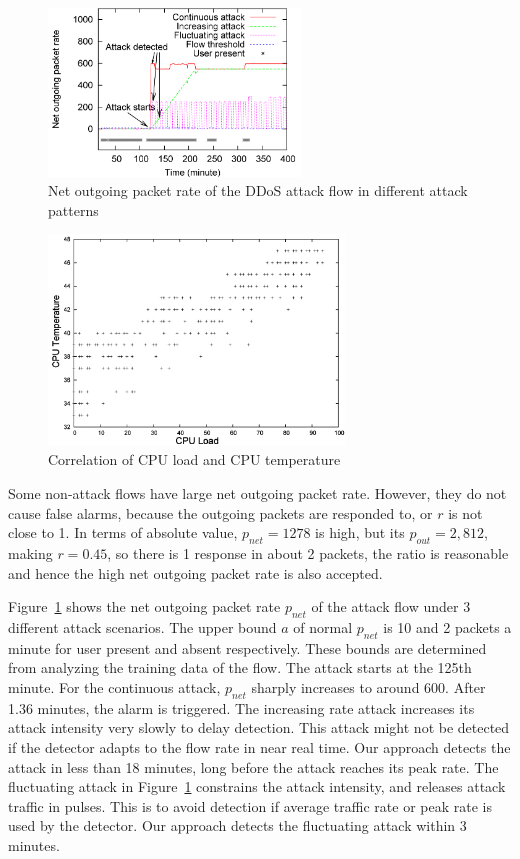 \begin{figure}[htb]
\centering
\includegraphics[width=0.6\textwidth]{sensor/ddos-atkflow.png}
\caption{Net outgoing packet rate of the DDoS attack flow in
different attack patterns}
\label{fig:ddos-atkflow}
\end{figure}

\begin{figure}[htb]
\centering
\includegraphics[width=0.7\textwidth]{sensor/load-temp.png}
\caption{Correlation of CPU load and CPU temperature}
\label{fig:temp-cpuload}
\end{figure}

Some non-attack flows have large net outgoing packet rate. However,
they do not cause false alarms, because the outgoing packets are
responded to, or $r$ is not close to 1. In terms of absolute value,
$p_{net}=1278$ is high, but its $p_{out}=2,812$, making $r=0.45$, so
there is 1 response in about 2 packets, the ratio is reasonable and
hence the high net outgoing packet rate is also accepted.

Figure~\ref{fig:ddos-atkflow} shows the net outgoing packet rate
$p_{net}$ of the attack flow under 3 different attack scenarios. The
upper bound $a$ of normal $p_{net}$ is 10 and 2 packets a minute for
user present and absent respectively. These bounds are determined
from analyzing the training data of the flow. The attack starts at
the 125th minute. For the continuous attack, $p_{net}$ sharply
increases to around 600. After 1.36 minutes, the alarm is triggered.
The increasing rate attack increases its attack intensity very
slowly to delay detection. This attack might not be detected if the
detector adapts to the flow rate in near real time. Our approach
detects the attack in less than 18 minutes, long before the attack
reaches its peak rate. The fluctuating attack in Figure~\ref{fig:ddos-atkflow}
constrains the attack intensity, and releases attack traffic in
pulses. This is to avoid detection if average traffic rate or peak
rate is used by the detector. Our approach detects the fluctuating
attack within 3 minutes.

